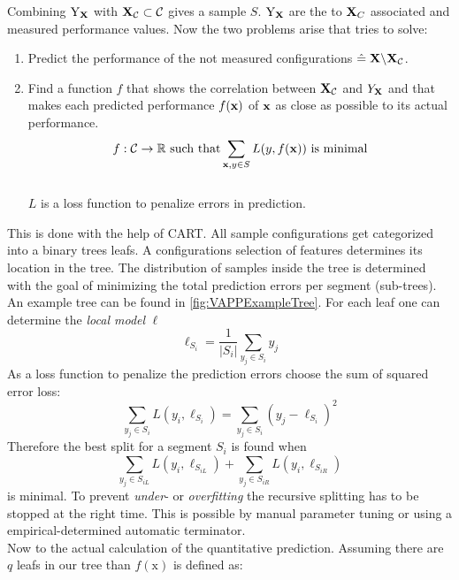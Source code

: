 Combining $\mathrm{Y}_{\mathbf{X}}$ with $\mathbf{X}_\mathcal{C}\subset\mathcal{C}$ gives a sample $S$. $\mathrm{Y}_{\mathbf{X}}$ are the to $\mathbf{X}_C$ associated and measured performance values. Now the two problems arise that \VAPP tries to solve:
\begin{enumerate}
	\item Predict the performance of the not measured configurations $\hat{=}\;\mathbf{X}\backslash\mathbf{X}_\mathcal{C}$.
	\item Find a function $f$ that shows the correlation between $\mathbf{X}_\mathcal{C}$ and $Y_{\mathbf{X}}$ and that makes each predicted performance $f(\mathrm{\mathbf{x}})$ of $\mathrm{\mathbf{x}}$ as close as possible to its actual performance.\\	
	\begin{equation}
	f : \mathcal{C} \rightarrow  \mathbb{R} \text{ such that} \sum_{\mathrm{\mathbf{x}},y \in S} L(y,f(\mathrm{\mathbf{x}})) \text{ is minimal}
	\end{equation}\\
	 $L$ is a loss function to penalize errors in prediction.
\end{enumerate}
This is done with the help of CART. All sample configurations get categorized into a binary trees leafs. A configurations selection of features determines its location in the tree. The distribution of samples inside the tree is determined with the goal of minimizing the total prediction errors per segment (sub-trees). An example tree can be found in \cref{fig:VAPPExampleTree}.
For each leaf one can determine the \textit{local model} $\ell$
\begin{equation}
	\ell_{S_i} = \frac{1}{|S_i|} \sum_{y_j \in S_i} y_j
\end{equation}
As a loss function to penalize the prediction errors \citet{VariabilityAwarePerformancePredictionJianmeiSigmundApel} choose the sum of squared error loss:
\begin{equation}
	\sum_{y_j \in S_i} L(y_i,\ell_{S_i}) = \sum_{y_j \in S_i} (y_j - \ell_{S_i})^2
\end{equation}
Therefore the best split for a segment $S_i$ is found when
\begin{equation*}
\sum_{y_j \in S_{iL}} L(y_i,\ell_{S_{iL}}) + \sum_{y_j \in S_{iR}} L(y_i,\ell_{S_{iR}})
\end{equation*}
is minimal. To prevent \textit{under}- or \textit{overfitting}\cite{ElementsOfStatisticalLearning} the recursive splitting has to be stopped at the right time. This is possible by manual parameter tuning or using a empirical-determined automatic terminator. \\
Now to the actual calculation of the quantitative prediction. Assuming there are $q$ leafs in our tree than $f(\mathrm{x})$ is defined as:
